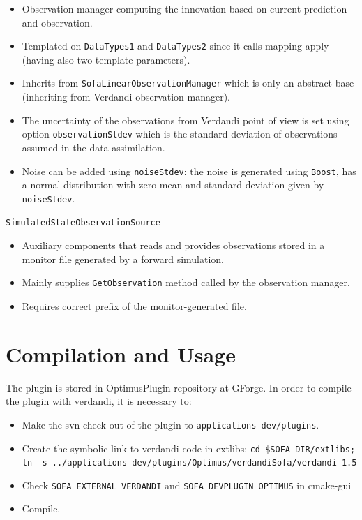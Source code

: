 \documentclass[10pt]{article}
\begin{document}
\begin{itemize}
\item Observation manager computing the innovation based on current prediction and observation.
\item Templated on \texttt{DataTypes1} and \texttt{DataTypes2} since it calls mapping apply (having also two template parameters).
\item Inherits from \texttt{SofaLinearObservationManager} which is only an abstract base (inheriting from Verdandi observation manager).
\item The uncertainty of the observations from Verdandi point of view is set using option \texttt{observationStdev} which is the standard deviation of observations assumed in the data assimilation. 
\item Noise can be added using \texttt{noiseStdev}: the noise is generated using \texttt{Boost}, has a normal distribution with zero mean and standard deviation given by \texttt{noiseStdev}. 
\end{itemize}
\medskip
{\large\texttt{SimulatedStateObservationSource}}
\begin{itemize}
\item Auxiliary components that reads and provides observations stored in a monitor file generated by a forward simulation.
\item Mainly supplies \texttt{GetObservation} method called by the observation manager. 
\item Requires correct prefix of the monitor-generated file. 
\end{itemize}

\section{Compilation and Usage}
The plugin is stored in OptimusPlugin repository at GForge. In order to compile the plugin with verdandi, it is necessary to:
\begin{itemize}
\item Make the svn check-out of the plugin to \texttt{applications-dev/plugins}.
\item Create the symbolic link to verdandi code in extlibs: \newline \texttt{cd \$SOFA\_DIR/extlibs; \newline ln -s
../applications-dev/plugins/Optimus/verdandiSofa/verdandi-1.5}
\item Check \texttt{SOFA\_EXTERNAL\_VERDANDI} and \texttt{SOFA\_DEVPLUGIN\_OPTIMUS} in cmake-gui
\item Compile.
\end{itemize}
\end{document}
